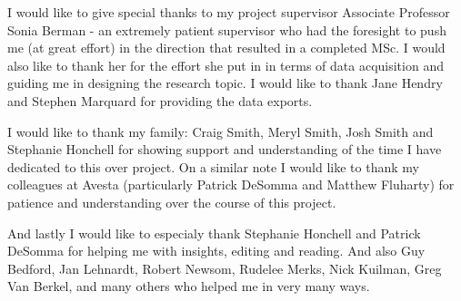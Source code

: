I would like to give special thanks to my project supervisor Associate Professor Sonia Berman - an extremely patient supervisor who had the foresight to push me (at great effort) in the direction that resulted in a completed MSc. I would also like to thank her for the effort she put in in terms of data acquisition and guiding me in designing the research topic. I would like to thank Jane Hendry and Stephen Marquard for providing the data exports.

I would like to thank my family: Craig Smith, Meryl Smith, Josh Smith and Stephanie Honchell for showing support and understanding of the time I have dedicated to this over project. On a similar note I would like to thank my colleagues at Avesta (particularly Patrick DeSomma and Matthew Fluharty) for patience and understanding over the course of this project.

And lastly I would like to especialy thank Stephanie Honchell and Patrick DeSomma for helping me with insights, editing and reading. And also Guy Bedford, Jan Lehnardt, Robert Newsom, Rudelee Merks, Nick Kuilman, Greg Van Berkel, and many others who helped me in very many ways.